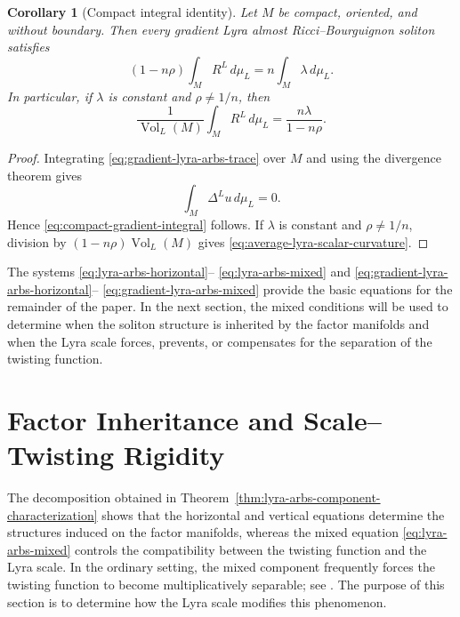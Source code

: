 \documentclass[a4paper,11pt]{article}
\theoremstyle{plain}
\newtheorem{corollary} {Corollary}[section]
\numberwithin{equation}{section}
\begin{document}
\begin{corollary}[Compact integral identity]
	\label{cor:compact-gradient-lyra-arbs}
	Let \(M\) be compact, oriented, and without boundary. Then every
	gradient Lyra almost Ricci--Bourguignon soliton satisfies
	\begin{equation}
		(1-n\rho)
		\int_{M}
		R^{L}\,d\mu_{L}
		=
		n
		\int_{M}
		\lambda\,d\mu_{L}.
		\label{eq:compact-gradient-integral}
	\end{equation}
	In particular, if \(\lambda\) is constant and
	\(\rho\neq 1/n\), then
	\begin{equation}
		\frac{1}{\operatorname{Vol}_{L}(M)}
		\int_{M}
		R^{L}\,d\mu_{L}
		=
		\frac{n\lambda}{1-n\rho}.
		\label{eq:average-lyra-scalar-curvature}
	\end{equation}
\end{corollary}

\begin{proof}
	Integrating \eqref{eq:gradient-lyra-arbs-trace} over \(M\) and
	using the divergence theorem gives
	\[
	\int_{M}
	\Delta^{L}u\,d\mu_{L}
	=
	0.
	\]
	Hence \eqref{eq:compact-gradient-integral} follows. If
	\(\lambda\) is constant and \(\rho\neq 1/n\), division by
	\((1-n\rho)\operatorname{Vol}_{L}(M)\) gives
	\eqref{eq:average-lyra-scalar-curvature}.
\end{proof}

The systems
\eqref{eq:lyra-arbs-horizontal}--
\eqref{eq:lyra-arbs-mixed} and
\eqref{eq:gradient-lyra-arbs-horizontal}--
\eqref{eq:gradient-lyra-arbs-mixed} provide the basic equations for
the remainder of the paper. In the next section, the mixed
conditions will be used to determine when the soliton structure is
inherited by the factor manifolds and when the Lyra scale forces,
prevents, or compensates for the separation of the twisting
function.

\section{Factor Inheritance and Scale--Twisting Rigidity}
\label{sec:factor-inheritance-rigidity}

The decomposition obtained in
Theorem~\ref{thm:lyra-arbs-component-characterization} shows that
the horizontal and vertical equations determine the structures
induced on the factor manifolds, whereas the mixed equation
\eqref{eq:lyra-arbs-mixed} controls the compatibility between the
twisting function and the Lyra scale. In the ordinary setting, the
mixed component frequently forces the twisting function to become
multiplicatively separable; see
\cite{ElsharkawyTawfiq2026,ElsharkawyCesaranoWanas2026}.
The purpose of this section is to determine how the Lyra scale
modifies this phenomenon.
\end{document}
